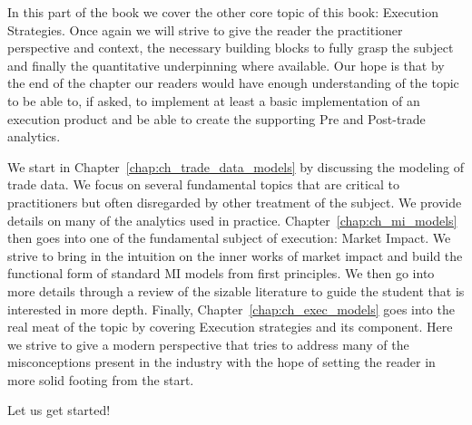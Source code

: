 
In this part of the book we cover the other core topic of this book: Execution Strategies. Once again we will strive to give the reader the practitioner perspective and context, the necessary building blocks to fully grasp the subject and finally the quantitative underpinning where available.  Our hope is that by the end of the chapter our readers would have enough understanding of the topic to be able to, if asked, to implement at least a basic implementation of an execution product and be able to create the supporting Pre and Post-trade analytics.


We start in Chapter~\ref{chap:ch_trade_data_models} by discussing the modeling of trade data. We focus on several fundamental topics that are critical to practitioners but often disregarded by other treatment of the subject. We provide details on many of the analytics used in practice. Chapter~\ref{chap:ch_mi_models} then goes into one of the fundamental subject of execution: Market Impact. We strive to bring in the intuition on the inner works of market impact and build the functional form of standard MI models from first principles. We then go into more details through a review of the sizable literature to guide the student that is interested in more depth. Finally, Chapter~\ref{chap:ch_exec_models} goes into the real meat of the topic by covering Execution strategies and its component. Here we strive to give a modern perspective that tries to address many of the misconceptions present in the industry with the hope of setting the reader in more solid footing from the start.


Let us get started!
